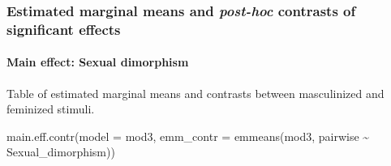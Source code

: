 \documentclass[
  bookmarksnumbered]{article}
\newenvironment{Shaded}{\begin{snugshade}}{\end{snugshade}}
\newcommand{\AttributeTok}[1]{\textcolor[rgb]{0.80,0.80,0.80}{#1}}
\newcommand{\FunctionTok}[1]{\textcolor[rgb]{0.94,0.94,0.56}{#1}}
\newcommand{\NormalTok}[1]{\textcolor[rgb]{0.80,0.80,0.80}{#1}}
\newcommand{\SpecialCharTok}[1]{\textcolor[rgb]{0.86,0.64,0.64}{#1}}
\begin{document}
\begin{table}[H]
\centering
\caption{\label{tab:tab-mod3}ANOVA-type table of fixed effects for the NF model}
\centering
{}
\end{table}

\subsubsection{\texorpdfstring{Estimated marginal means and \emph{post-hoc} contrasts of significant effects}{Estimated marginal means and post-hoc contrasts of significant effects}}\label{estimated-marginal-means-and-post-hoc-contrasts-of-significant-effects-2}

\paragraph{Main effect: Sexual dimorphism}\label{main-effect-sexual-dimorphism-2}

Table of estimated marginal means and contrasts between masculinized and feminized stimuli.

\begin{Shaded}
\begin{Highlighting}[]
\FunctionTok{main.eff.contr}\NormalTok{(}\AttributeTok{model =}\NormalTok{ mod3,}
               \AttributeTok{emm\_contr =} \FunctionTok{emmeans}\NormalTok{(mod3, pairwise }\SpecialCharTok{\textasciitilde{}}\NormalTok{ Sexual\_dimorphism))}
\end{Highlighting}
\end{Shaded}
\end{document}
